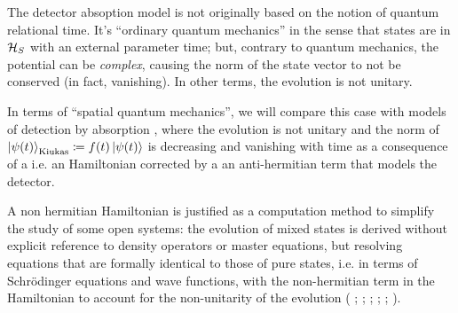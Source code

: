 
The detector absoption model \cite{RuschhauptAbsorption} is not originally
based on the notion of quantum relational time. It's ``ordinary quantum mechanics''
in the sense that states are in $\mathcal{H}_S$ with an external parameter time;
but, contrary to quantum mechanics, the potential can be \emph{complex},
causing the norm of the state vector to not be conserved (in fact, vanishing).
In other terms, the evolution is not unitary.

In terms of ``spatial quantum mechanics'', we will compare this case with
models of detection by absorption ,
where the evolution is not unitary and
the norm of
$\ket{\psi(t)}_{\mathrm{Kiukas}} \coloneqq f(t)\ket{\psi(t)}$
is decreasing and vanishing with time
as a consequence of a 
i.e.
an Hamiltonian corrected by a an anti-hermitian term
that models the detector.

A non hermitian Hamiltonian is justified as a computation method
to simplify the study of some open systems: the evolution of mixed
states is derived without explicit reference to density operators
or master equations, but resolving equations that are formally
identical to those of pure states,
i.e. in terms of
Schr{\"o}dinger equations and wave functions,
with the non-hermitian term in the Hamiltonian
to account for the non-unitarity of the evolution
(%
  \cite[Ch. 6]{TQM2};
  \cite{Wave-function_approach};
  \cite{HowToResetAnAtom};
  \cite{TheQuantumJumpApproach};
  \cite[\S 8.5 ``The `quantum jump' approach to damping'' and particularly \S 8.5.2 ``The wave function Monte Carlo approach to damping'']{ScullyZubairy};
  \cite[particularly \S 6.7.1 ``Simulating Quantum Trajectories'']{WallsMilburn}%
).

